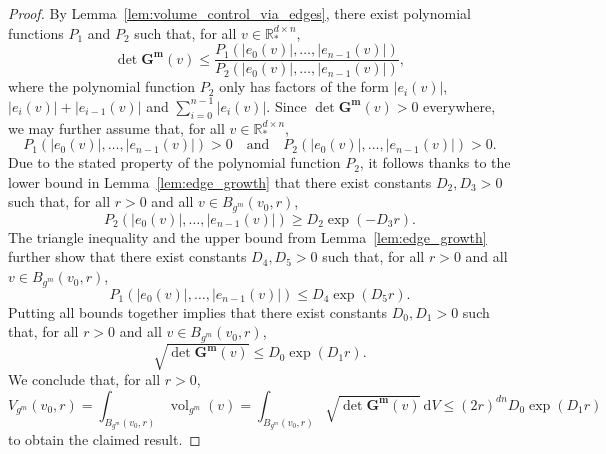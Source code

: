 \documentclass[10pt,a4paper]{amsart}
\newcommand{\R}{\mathbb{R}}
\newcommand{\dd}{\,{\mathrm d}}
\newcommand{\vol}{\operatorname{vol}}
\begin{document}
\begin{proof}
    By Lemma~\ref{lem:volume_control_via_edges}, there exist polynomial functions $P_1$ and $P_2$ such that, for all $v\in\R^{d\times n}_*$,
    \begin{displaymath}
        \det\mathbf{G^m}(v)
        \leq\frac{P_1(|e_0(v)|,\dots,|e_{n-1}(v)|)}{P_2(|e_0(v)|,\dots,|e_{n-1}(v)|)},
    \end{displaymath}
    where the polynomial function $P_2$ only has factors of the form $|e_i(v)|$, $|e_i(v)|+|e_{i-1}(v)|$ and $\sum_{i=0}^{n-1}|e_i(v)|$. Since $\det\mathbf{G^m}(v)>0$ everywhere, we may further assume that, for all $v\in\R^{d\times n}_*$,
    \begin{displaymath}
        P_1(|e_0(v)|,\dots,|e_{n-1}(v)|)>0
        \quad\text{and}\quad
        P_2(|e_0(v)|,\dots,|e_{n-1}(v)|)>0.
    \end{displaymath}
    Due to the stated property of the polynomial function $P_2$, it follows thanks to the lower bound in Lemma~\ref{lem:edge_growth} that there exist constants $D_2,D_3>0$ such that, for all $r>0$ and all $v\in B_{g^m}(v_0,r)$,
    \begin{displaymath}
        P_2(|e_0(v)|,\dots,|e_{n-1}(v)|)\geq D_2\exp\left(-D_3 r\right).
    \end{displaymath}
    The triangle inequality and the upper bound from Lemma~\ref{lem:edge_growth} further show that there exist constants $D_4,D_5>0$ such that, for all $r>0$ and all $v\in B_{g^m}(v_0,r)$,
    \begin{displaymath}
        P_1(|e_0(v)|,\dots,|e_{n-1}(v)|)\leq D_4\exp\left(D_5 r\right).
    \end{displaymath}
    Putting all bounds together implies that there exist constants $D_0,D_1>0$ such that, for all $r>0$ and all $v\in B_{g^m}(v_0,r)$,
    \begin{displaymath}
        \sqrt{\det\mathbf{G^m}(v)}\leq D_0\exp\left(D_1 r\right).
    \end{displaymath}
    We conclude that, for all $r>0$,
    \begin{displaymath}
        V_{g^m}(v_0,r)
        =\int_{B_{g^m}(v_0,r)}\vol_{g^m}(v)
        =\int_{B_{g^m}(v_0,r)}\sqrt{\det\mathbf{G^m}(v)}\dd V
        \leq \left(2r\right)^{dn}D_0\exp\left(D_1 r\right)
    \end{displaymath}
    to obtain the claimed result.
\end{proof}
\end{document}
